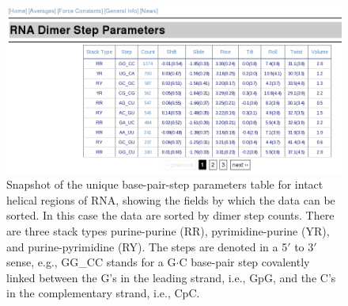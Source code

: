 \begin{figure}[htbp]
\centering
\includegraphics[angle=0, scale=0.48]{Chapter4/average.png}
\caption{Snapshot of  the unique  base-pair-step parameters  table for
intact helical  regions of RNA, showing  the fields by  which the data
can  be  sorted. In  this  case  the data  are  sorted  by dimer  step
counts.   There   are    three   stack   types   purine-purine   (RR),
pyrimidine-purine  (YR),  and purine-pyrimidine  (RY).  The steps  are
denoted in a  5$'$ to 3$'$ sense, e.g., GG\_CC  stands for a G$\cdot$C
base-pair  step  covalently linked  between  the  G's  in the  leading
strand,  i.e., GpG,  and the  C's in  the complementary  strand, i.e.,
CpC.}
\label{fig:average}
\end{figure}  


